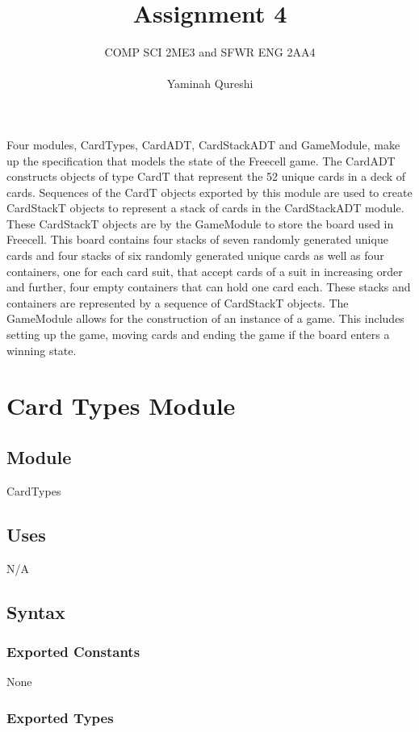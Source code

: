 \documentclass[12pt,fleqn]{article}
\title{Assignment 4}
\author{COMP SCI 2ME3 and SFWR ENG 2AA4\\\\Yaminah Qureshi}
\begin{document}
\maketitle

Four modules, CardTypes, CardADT, CardStackADT and GameModule, make up the specification that models the state of the Freecell game. The CardADT constructs objects of type CardT that represent the 52 unique cards in a deck of cards. Sequences of the CardT objects exported by this module are used to create CardStackT objects to represent a stack of cards in the CardStackADT module. These CardStackT objects are by the GameModule to store the board used in Freecell. This board contains four stacks of seven randomly generated unique cards and four stacks of six randomly generated unique cards as well as four containers, one for each card suit, that accept cards of a suit in increasing order and further, four empty containers that can hold one card each. These stacks and containers are represented by a sequence of CardStackT objects. The GameModule allows for the construction of an instance of a game. This includes setting up the game, moving cards and ending the game if the board enters a winning state.

\newpage

\section* {Card Types Module}

\subsection*{Module}

CardTypes

\subsection* {Uses}

N/A

\subsection* {Syntax}

\subsubsection* {Exported Constants}

None

\subsubsection* {Exported Types}
\end{document}
